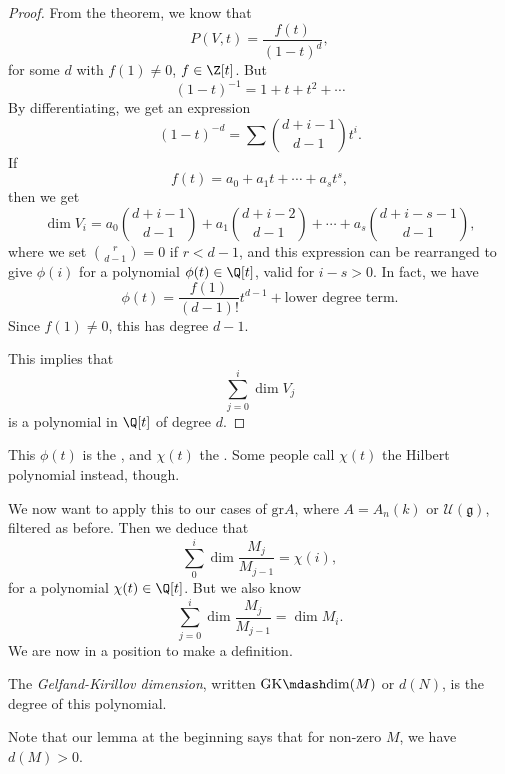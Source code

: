 \documentclass[a4paper]{article}
\renewcommand\Gr{\mathrm{gr}}
\newcommand\GKdim{\mathrm{GK}\mdash\mathrm{dim}}
\begin{document}
\begin{proof}
  From the theorem, we know that
  \[
    P(V, t) = \frac{f(t)}{(1 - t)^d},
  \]
  for some $d$ with $f(1) \not= 0$, $f \in \Z[t]$. But
  \[
    (1 - t)^{-1} = 1 + t + t^2 + \cdots
  \]
  By differentiating, we get an expression
  \[
    (1 - t)^{-d} = \sum \binom{d + i - 1}{d - 1} t^i.
  \]
  If
  \[
    f(t) = a_0 + a_1 t + \cdots + a_s t^s,
  \]
  then we get
  \[
    \dim V_i = a_0 \binom{d + i - 1}{d - 1} + a_1 \binom{d + i - 2}{d - 1} + \cdots + a_s \binom{d + i - s- 1}{d - 1},
  \]
  where we set $\binom{r}{d - 1} = 0$ if $r < d - 1$, and this expression can be rearranged to give $\phi(i)$ for a polynomial $\phi(t) \in \Q[t]$, valid for $i - s > 0$. In fact, we have
  \[
    \phi(t) = \frac{f(1)}{(d - 1)!} t^{d - 1} + \text{lower degree term}.
  \]
  Since $f(1) \not= 0$, this has degree $d - 1$.

  This implies that
  \[
    \sum_{j = 0}^i \dim V_j
  \]
  is a polynomial in $\Q[t]$ of degree $d$.
\end{proof}
This $\phi(t)$ is the , and $\chi(t)$ the . Some people call $\chi(t)$ the Hilbert polynomial instead, though.

We now want to apply this to our cases of $\Gr A$, where $A = A_n(k)$ or $\mathcal{U}(\mathfrak{g})$, filtered as before. Then we deduce that
\[
  \sum_0^i \dim \frac{M_j}{M_{j - 1}} = \chi(i),
\]
for a polynomial $\chi(t) \in \Q[t]$. But we also know
\[
  \sum_{j = 0}^i \dim \frac{M_j}{M_{j - 1}} = \dim M_i.
\]
We are now in a position to make a definition.
\begin{defi}\index{$\GKdim(M)$}
  The \emph{Gelfand-Kirillov dimension}, written $\GKdim(M)$ or $d(N)$, is the degree of this polynomial.
\end{defi}
Note that our lemma at the beginning says that for non-zero $M$, we have $d(M) > 0$.
\printindex
\end{document}
